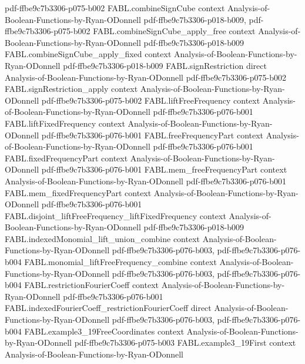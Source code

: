 \begin{theorem}
{    pdf-ffbe9c7b3306-p075-b002}
\proofstep
  {FABL.combineSignCube}
  {context}
  {Analysis-of-Boolean-Functions-by-Ryan-ODonnell}
  {pdf-ffbe9c7b3306-p018-b009,
    pdf-ffbe9c7b3306-p075-b002}
\proofstep
  {FABL.combineSignCube_apply_free}
  {context}
  {Analysis-of-Boolean-Functions-by-Ryan-ODonnell}
  {pdf-ffbe9c7b3306-p018-b009}
\proofstep
  {FABL.combineSignCube_apply_fixed}
  {context}
  {Analysis-of-Boolean-Functions-by-Ryan-ODonnell}
  {pdf-ffbe9c7b3306-p018-b009}
\proofstep
  {FABL.signRestriction}
  {direct}
  {Analysis-of-Boolean-Functions-by-Ryan-ODonnell}
  {pdf-ffbe9c7b3306-p075-b002}
\proofstep
  {FABL.signRestriction_apply}
  {context}
  {Analysis-of-Boolean-Functions-by-Ryan-ODonnell}
  {pdf-ffbe9c7b3306-p075-b002}
\proofstep
  {FABL.liftFreeFrequency}
  {context}
  {Analysis-of-Boolean-Functions-by-Ryan-ODonnell}
  {pdf-ffbe9c7b3306-p076-b001}
\proofstep
  {FABL.liftFixedFrequency}
  {context}
  {Analysis-of-Boolean-Functions-by-Ryan-ODonnell}
  {pdf-ffbe9c7b3306-p076-b001}
\proofstep
  {FABL.freeFrequencyPart}
  {context}
  {Analysis-of-Boolean-Functions-by-Ryan-ODonnell}
  {pdf-ffbe9c7b3306-p076-b001}
\proofstep
  {FABL.fixedFrequencyPart}
  {context}
  {Analysis-of-Boolean-Functions-by-Ryan-ODonnell}
  {pdf-ffbe9c7b3306-p076-b001}
\proofstep
  {FABL.mem_freeFrequencyPart}
  {context}
  {Analysis-of-Boolean-Functions-by-Ryan-ODonnell}
  {pdf-ffbe9c7b3306-p076-b001}
\proofstep
  {FABL.mem_fixedFrequencyPart}
  {context}
  {Analysis-of-Boolean-Functions-by-Ryan-ODonnell}
  {pdf-ffbe9c7b3306-p076-b001}
\proofstep
  {FABL.disjoint_liftFreeFrequency_liftFixedFrequency}
  {context}
  {Analysis-of-Boolean-Functions-by-Ryan-ODonnell}
  {pdf-ffbe9c7b3306-p018-b009}
\proofstep
  {FABL.indexedMonomial_lift_union_combine}
  {context}
  {Analysis-of-Boolean-Functions-by-Ryan-ODonnell}
  {pdf-ffbe9c7b3306-p076-b003,
    pdf-ffbe9c7b3306-p076-b004}
\proofstep
  {FABL.monomial_liftFreeFrequency_combine}
  {context}
  {Analysis-of-Boolean-Functions-by-Ryan-ODonnell}
  {pdf-ffbe9c7b3306-p076-b003,
    pdf-ffbe9c7b3306-p076-b004}
\proofstep
  {FABL.restrictionFourierCoeff}
  {context}
  {Analysis-of-Boolean-Functions-by-Ryan-ODonnell}
  {pdf-ffbe9c7b3306-p076-b001}
\proofstep
  {FABL.indexedFourierCoeff_restrictionFourierCoeff}
  {direct}
  {Analysis-of-Boolean-Functions-by-Ryan-ODonnell}
  {pdf-ffbe9c7b3306-p076-b003,
    pdf-ffbe9c7b3306-p076-b004}
\proofstep
  {FABL.example3_19FreeCoordinates}
  {context}
  {Analysis-of-Boolean-Functions-by-Ryan-ODonnell}
  {pdf-ffbe9c7b3306-p075-b003}
\proofstep
  {FABL.example3_19First}
  {context}
  {Analysis-of-Boolean-Functions-by-Ryan-ODonnell}

\end{theorem}
